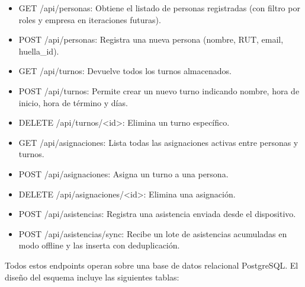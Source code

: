 \begin{itemize}
    \item GET /api/personas: Obtiene el listado de personas registradas (con filtro por roles y empresa en iteraciones futuras).
    \item POST /api/personas: Registra una nueva persona (nombre, RUT, email, huella\_id).
    \item GET /api/turnos: Devuelve todos los turnos almacenados.
    \item POST /api/turnos: Permite crear un nuevo turno indicando nombre, hora de inicio, hora de término y días.
    \item DELETE /api/turnos/<id>: Elimina un turno específico.
    \item GET /api/asignaciones: Lista todas las asignaciones activas entre personas y turnos.
    \item POST /api/asignaciones: Asigna un turno a una persona.
    \item DELETE /api/asignaciones/<id>: Elimina una asignación.
    \item POST /api/asistencias: Registra una asistencia enviada desde el dispositivo.
    \item POST /api/asistencias/sync: Recibe un lote de asistencias acumuladas en modo offline y las inserta con deduplicación.
\end{itemize}

Todos estos endpoints operan sobre una base de datos relacional PostgreSQL. El diseño del esquema incluye las siguientes tablas:

